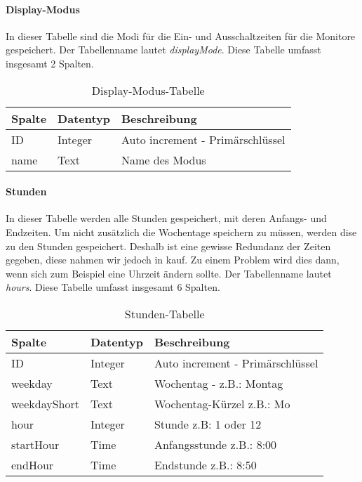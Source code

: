 \paragraph{Display-Modus\\}
In dieser Tabelle sind die Modi für die Ein- und Ausschaltzeiten für die Monitore gespeichert. Der Tabellenname lautet \textit{displayMode}. Diese Tabelle umfasst insgesamt 2 Spalten.
\begin{table}[H]
\centering
\begin{tabular}{p{2.5 cm}p{2.5 cm}p{10 cm}}
   \toprule
   \textbf{Spalte} & \textbf{Datentyp} & \textbf{Beschreibung} \\
   \midrule
          ID & Integer & Auto increment - Primärschlüssel  \\
          \hline
          name & Text & Name des Modus \\
   \bottomrule
\end{tabular}
\caption{Display-Modus-Tabelle}
\end{table}

\paragraph{Stunden\\}
In dieser Tabelle werden alle Stunden gespeichert, mit deren Anfangs- und Endzeiten. Um nicht zusätzlich die Wochentage speichern zu müssen, werden dise zu den Stunden gespeichert. Deshalb ist eine gewisse Redundanz der Zeiten gegeben, diese nahmen wir jedoch in kauf. Zu einem Problem wird dies dann, wenn sich zum Beispiel eine Uhrzeit ändern sollte. Der Tabellenname lautet \textit{hours}. Diese Tabelle umfasst insgesamt 6 Spalten.
\begin{table}[H]
\centering
\begin{tabular}{p{2.5 cm}p{2.5 cm}p{10 cm}}
   \toprule
   \textbf{Spalte} & \textbf{Datentyp} & \textbf{Beschreibung} \\
   \midrule
          ID & Integer & Auto increment - Primärschlüssel  \\
          \hline
          weekday & Text & Wochentag - z.B.: Montag  \\
          \hline
          weekdayShort & Text & Wochentag-Kürzel z.B.: Mo   \\
          \hline
          hour & Integer & Stunde z.B: 1 oder 12  \\
          \hline
          startHour & Time & Anfangsstunde z.B.: 8:00  \\
          \hline
          endHour & Time & Endstunde z.B.: 8:50 \\
   \bottomrule
\end{tabular}
\caption{Stunden-Tabelle}
\end{table}

